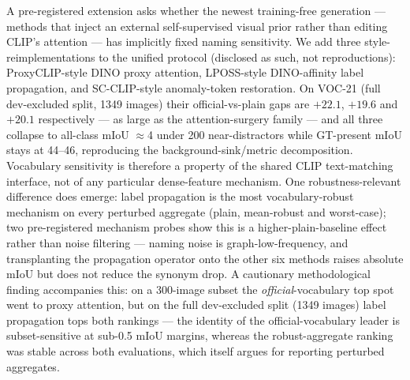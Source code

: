 \documentclass[11pt]{article}
\newcommand{\miou}{mIoU}
\begin{document}
A pre-registered extension asks whether the newest training-free generation ---
methods that inject an external self-supervised visual prior rather than editing
CLIP's attention --- has implicitly fixed naming sensitivity. We add three
style-reimplementations to the unified protocol (disclosed as such, not
reproductions): ProxyCLIP-style DINO \citep{caron2021dino} proxy attention, LPOSS-style DINO-affinity
label propagation, and SC-CLIP-style anomaly-token restoration. On VOC-21
(full dev-excluded split, 1349 images) their official-vs-plain gaps are
$+22.1$, $+19.6$ and $+20.1$ respectively --- as large as the attention-surgery family --- and all three
collapse to all-class \miou{} $\approx$4 under 200 near-distractors while
GT-present \miou{} stays at 44--46, reproducing the background-sink/metric
decomposition. Vocabulary sensitivity is therefore a property of the shared
CLIP text-matching interface, not of any particular dense-feature mechanism.
One robustness-relevant difference does emerge: label propagation is the most
vocabulary-robust mechanism on every perturbed aggregate (plain, mean-robust
and worst-case); two pre-registered mechanism probes show this is a
higher-plain-baseline effect rather than noise filtering --- naming noise is
graph-low-frequency, and transplanting the propagation operator onto the other
six methods raises absolute \miou{} but does not reduce the synonym drop.
A cautionary methodological finding accompanies this: on a
300-image subset the \emph{official}-vocabulary top spot went to proxy
attention, but on the full dev-excluded split (1349 images) label propagation
tops both rankings --- the identity of the official-vocabulary leader is
subset-sensitive at sub-0.5 \miou{} margins, whereas the robust-aggregate
ranking was stable across both evaluations, which itself argues for reporting
perturbed aggregates.
\end{document}
